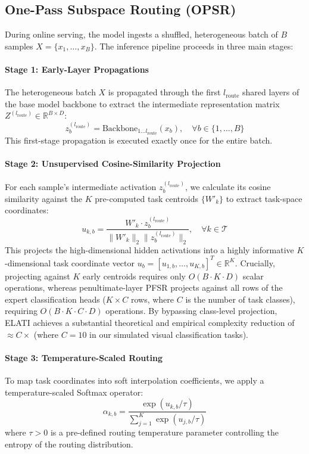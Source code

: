 \subsection{One-Pass Subspace Routing (OPSR)}
During online serving, the model ingests a shuffled, heterogeneous batch of $B$ samples $X = \{x_1, \dots, x_B\}$.
The inference pipeline proceeds in three main stages:

\paragraph{Stage 1: Early-Layer Propagations}
The heterogeneous batch $X$ is propagated through the first $l_{\text{route}}$ shared layers of the base model backbone to extract the intermediate representation matrix $Z^{(l_{\text{route}})} \in \mathbb{R}^{B \times D}$:
\begin{equation}
    z_b^{(l_{\text{route}})} = \text{Backbone}_{1 \dots l_{\text{route}}}(x_b), \quad \forall b \in \{1, \dots, B\}
\end{equation}
This first-stage propagation is executed exactly once for the entire batch.

\paragraph{Stage 2: Unsupervised Cosine-Similarity Projection}
For each sample's intermediate activation $z_b^{(l_{\text{route}})}$, we calculate its cosine similarity against the $K$ pre-computed task centroids $\{W'_k\}$ to extract task-space coordinates:
\begin{equation}
    u_{k, b} = \frac{W'_{k} \cdot z_b^{(l_{\text{route}})}}{\|W'_{k}\|_2 \|z_b^{(l_{\text{route}})}\|_2}, \quad \forall k \in \mathcal{T}
\end{equation}
This projects the high-dimensional hidden activations into a highly informative $K$-dimensional task coordinate vector $u_b = [u_{1,b}, \dots, u_{K,b}]^T \in \mathbb{R}^K$.
Crucially, projecting against $K$ early centroids requires only $O(B \cdot K \cdot D)$ scalar operations, whereas penultimate-layer PFSR projects against all rows of the expert classification heads ($K \times C$ rows, where $C$ is the number of task classes), requiring $O(B \cdot K \cdot C \cdot D)$ operations.
By bypassing class-level projection, ELATI achieves a substantial theoretical and empirical complexity reduction of $\approx C\times$ (where $C = 10$ in our simulated visual classification tasks).

\paragraph{Stage 3: Temperature-Scaled Routing}
To map task coordinates into soft interpolation coefficients, we apply a temperature-scaled Softmax operator:
\begin{equation}
    \alpha_{k, b} = \frac{\exp(u_{k, b} / \tau)}{\sum_{j=1}^K \exp(u_{j, b} / \tau)}
\end{equation}
where $\tau > 0$ is a pre-defined routing temperature parameter controlling the entropy of the routing distribution.

